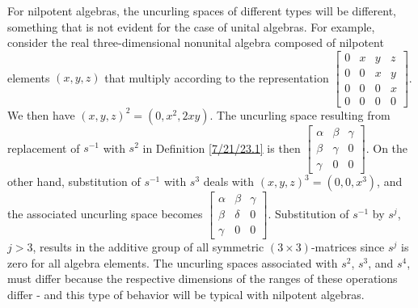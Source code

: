 \documentclass{amsart}
\numberwithin{equation}{section}
\theoremstyle{definition}
\numberwithin{theorem}{section}
\begin{document}
For nilpotent algebras, the uncurling spaces of different types will be different, something that is not evident for the case of unital algebras.  For example, consider the real three-dimensional nonunital algebra composed of nilpotent elements $(x,y,z)$ that multiply according to the representation
  $ \left[
\begin{array}{ccccc}
0 & x & y & z  \\
0 & 0 & x & y \\
0 & 0 & 0 & x \\
0 & 0 & 0 & 0
\end{array}
\right] $.  We then have $(x,y,z)^2 = (0,x^2, 2xy)$.  The uncurling space resulting from replacement of $s^{-1}$ with  $s^2$ in Definition \ref{7/21/23.1} is then $\left[
\begin{array}{ccccc}
\alpha & \beta & \gamma   \\
\beta & \gamma & 0 \\
\gamma & 0 & 0  
\end{array}
\right] $.  On the other hand, substitution of $s^{-1}$ with $s^3$  deals with $(x,y,z)^3 = (0,0, x^3)$, and the associated uncurling space becomes $\left[
\begin{array}{ccccc}
\alpha & \beta & \gamma   \\
\beta & \delta & 0 \\
\gamma & 0 & 0  
\end{array}
\right] $.  Substitution of $s^{-1}$ by $s^j$, $j>3$, results in the additive group of all symmetric $(3\times 3)$-matrices since $s^j$ is zero for all algebra elements.  The uncurling spaces associated with $s^2$, $s^3$, and $s^4$, must differ because the respective dimensions of the ranges of these operations differ - and this type of behavior will be typical with nilpotent algebras.  
 

\vspace{1cm}

\appendix
\end{document}
